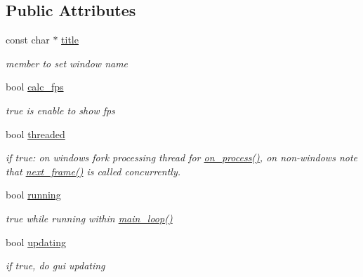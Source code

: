\subsection*{Public Attributes}
\begin{DoxyCompactItemize}
\item 
\hypertarget{classvideo_a7bd887d60b3c95f2063084f1dd7b6471}{}const char $\ast$ \hyperlink{classvideo_a7bd887d60b3c95f2063084f1dd7b6471}{title}\label{classvideo_a7bd887d60b3c95f2063084f1dd7b6471}

\begin{DoxyCompactList}\small\item\em member to set window name \end{DoxyCompactList}\item 
\hypertarget{classvideo_a3f1e0f6522e93643c4c507e0ad0a7176}{}bool \hyperlink{classvideo_a3f1e0f6522e93643c4c507e0ad0a7176}{calc\+\_\+fps}\label{classvideo_a3f1e0f6522e93643c4c507e0ad0a7176}

\begin{DoxyCompactList}\small\item\em true is enable to show fps \end{DoxyCompactList}\item 
\hypertarget{classvideo_ac4a3b59a0178b3296aed23fa0950afa3}{}bool \hyperlink{classvideo_ac4a3b59a0178b3296aed23fa0950afa3}{threaded}\label{classvideo_ac4a3b59a0178b3296aed23fa0950afa3}

\begin{DoxyCompactList}\small\item\em if true\+: on windows fork processing thread for \hyperlink{classvideo_a9cd55e23921c925eb2c912e40df96d05}{on\+\_\+process()}, on non-\/windows note that \hyperlink{classvideo_a267748c31dee7dd46d47b575373959db}{next\+\_\+frame()} is called concurrently. \end{DoxyCompactList}\item 
\hypertarget{classvideo_a425f3ca7a2d288c84ccae73ebb49f345}{}bool \hyperlink{classvideo_a425f3ca7a2d288c84ccae73ebb49f345}{running}\label{classvideo_a425f3ca7a2d288c84ccae73ebb49f345}

\begin{DoxyCompactList}\small\item\em true while running within \hyperlink{classvideo_a664f8ebc86f954bb4435c34b62116611}{main\+\_\+loop()} \end{DoxyCompactList}\item 
\hypertarget{classvideo_aa7d71282267e2725ebd3c698c30c2e93}{}bool \hyperlink{classvideo_aa7d71282267e2725ebd3c698c30c2e93}{updating}\label{classvideo_aa7d71282267e2725ebd3c698c30c2e93}

\begin{DoxyCompactList}\small\item\em if true, do gui updating \end{DoxyCompactList}\end{DoxyCompactItemize}
